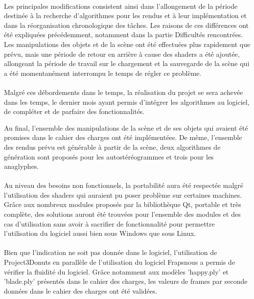 \paragraph{}
Les principales modifications consistent ainsi dans l'allongement de la période destinée à la recherche d'algorithmes pour les rendus et à leur implémentation et dans la réorganisation chronologique des tâches. Les raisons de ces différences ont été expliquées précédemment, notamment dans la partie Difficultés rencontrées.
Les manipulations des objets et de la scène ont été effectuées plus rapidement que prévu, mais une période de retour en arrière à cause des shaders a été ajoutée, allongeant la période de travail sur le chargement et la sauvegarde de la scène qui a été momentanément interrompu le temps de régler ce problème.

\paragraph{}
Malgré ces débordements dans le temps, la réalisation du projet se sera achevée dans les temps, le dernier mois ayant permis d'intégrer les algorithmes au logiciel, de compléter et de parfaire des fonctionnalités.

Au final, l'ensemble des manipulations de la scène et de ses objets qui avaient été promises dans le cahier des charges ont été implémentées. De même, l'ensemble des rendus prévu est générable à partir de la scène, deux algorithmes de génération sont proposés pour les autostéréogrammes et trois pour les anaglyphes.

\paragraph{}
Au niveau des besoins non fonctionnels, la portabilité aura été respectée malgré l'utilisation des shaders qui auraient pu poser problème sur certaines machines. Grâce aux nombreux modules proposés par la bibliothèque Qt, portable et très complète, des solutions auront été trouvées pour l'ensemble des modules et des cas d'utilisation sans avoir à sacrifier de fonctionnalité pour permettre l'utilisation du logiciel aussi bien sous Windows que sous Linux.

\paragraph{}
Bien que l'indication ne soit pas donnée dans le logiciel, l'utilisation de Project3Donuts en parallèle de l'utilisation du logiciel Fraps\footnotemark nous a permis de vérifier la fluidité du logiciel. Grâce notamment aux modèles 'happy.ply' et 'blade.ply' présentés dans le cahier des charges, les valeurs de frames par seconde données dans le cahier des charges ont été validées.
